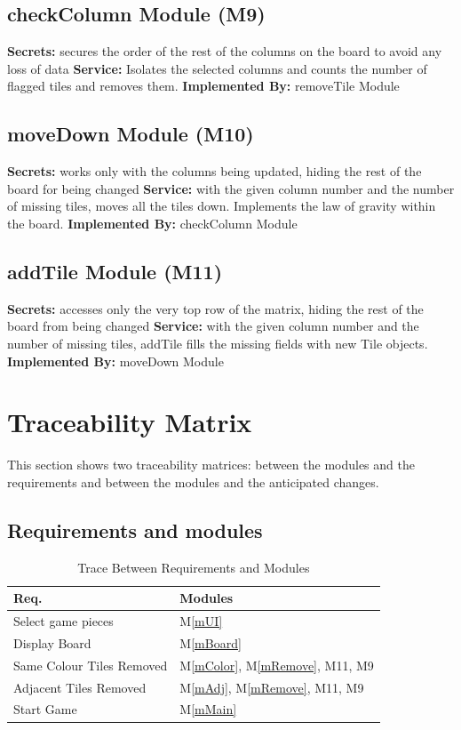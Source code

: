 \documentclass[12pt]{article}
\newcommand{\mref}[1]{M\ref{#1}}
\begin{document}
\subsection{checkColumn Module (M9)}
\textbf{Secrets:} secures the order of the rest of the columns on the board to avoid any loss of data
\textbf{Service:} Isolates the selected columns and counts the number of flagged tiles and removes them.
\textbf{Implemented By:} removeTile Module

\subsection{moveDown Module (M10)}
\textbf{Secrets:} works only with the columns being updated, hiding the rest of the board for being changed
\textbf{Service:} with the given column number and the number of missing tiles, moves all the tiles down. Implements the law of gravity within the board.
\textbf{Implemented By:} checkColumn Module

\subsection{addTile Module (M11)}
\textbf{Secrets:} accesses only the very top row of the matrix, hiding the rest of the board from being changed
\textbf{Service:} with the given column number and the number of missing tiles, addTile fills the missing fields with new Tile objects.
\textbf{Implemented By:} moveDown Module

\section{Traceability Matrix} \label{SecTM}

This section shows two traceability matrices: between the modules and the
requirements and between the modules and the anticipated changes.
\subsection{Requirements and modules}
\begin{table}[H]
\centering
\begin{tabular}{p{} p{}}
\toprule
\textbf{Req.} & \textbf{Modules}\\
\midrule
Select game pieces & \mref{mUI}\\
Display Board & \mref{mBoard}\\
Same Colour Tiles Removed & \mref{mColor}, \mref{mRemove}, M11, M9\\
Adjacent Tiles Removed & \mref{mAdj}, \mref{mRemove}, M11, M9\\
Start Game & \mref{mMain}\\

\bottomrule
\end{tabular}
\caption{Trace Between Requirements and Modules}
\label{TblRT}
\end{table}
\end{document}
